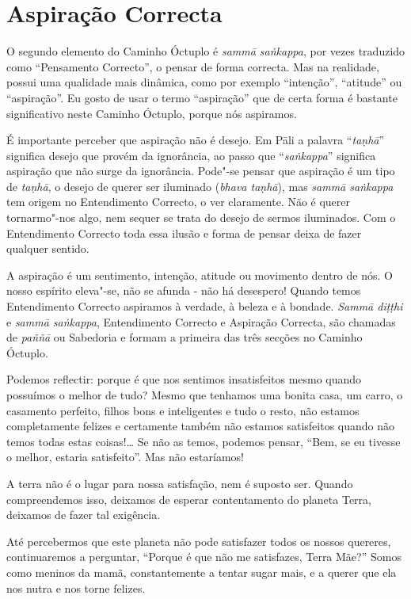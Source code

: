 \section{Aspiração Correcta}

O segundo elemento do Caminho Óctuplo é \emph{sammā saṅkappa}, por vezes traduzido como
“Pensamento Correcto”, o pensar de forma correcta. Mas na realidade, possui uma
qualidade mais dinâmica, como por exemplo “intenção”, “atitude” ou “aspiração”.
Eu gosto de usar o termo “aspiração” que de certa forma é bastante significativo
neste Caminho Óctuplo, porque nós aspiramos.

É importante perceber que aspiração não é desejo. Em Pāli a palavra
“\emph{taṇhā}” significa desejo que provém da ignorância, ao passo que
“\emph{saṅkappa}” significa aspiração que não surge da ignorância. Pode"-se
pensar que aspiração é um tipo de \emph{taṇhā}, o desejo de querer ser iluminado
(\emph{bhava taṇhā}), mas \emph{sammā saṅkappa} tem origem no Entendimento
Correcto, o ver claramente. Não é querer tornarmo"-nos algo, nem sequer se
trata do desejo de sermos iluminados. Com o Entendimento Correcto toda essa ilusão
e forma de pensar deixa de fazer qualquer sentido.

A aspiração é um sentimento, intenção, atitude ou movimento dentro de nós. O
nosso espírito eleva"-se, não se afunda - não há desespero! Quando temos
Entendimento Correcto aspiramos à verdade, à beleza e à bondade. \emph{Sammā
  diṭṭhi} e \emph{sammā saṅkappa}, Entendimento Correcto e Aspiração Correcta,
são chamadas de \emph{paññā} ou Sabedoria e formam a primeira das três secções
no Caminho Óctuplo.

\sectionBreak

Podemos reflectir: porque é que nos sentimos insatisfeitos mesmo quando
possuímos o melhor de tudo? Mesmo que tenhamos uma bonita casa, um carro, o
casamento perfeito, filhos bons e inteligentes e tudo o resto, não estamos
completamente felizes e certamente também não estamos satisfeitos quando não
temos todas estas coisas!\ldots{} Se não as temos, podemos pensar, “Bem, se eu
tivesse o melhor, estaria satisfeito”. Mas não estaríamos!

A terra não é o lugar
para nossa satisfação, nem é suposto ser. Quando compreendemos isso, deixamos de
esperar contentamento do planeta Terra, deixamos de fazer tal exigência.

Até percebermos que este planeta não pode satisfazer todos os nossos quereres,
continuaremos a perguntar, “Porque é que não me satisfazes, Terra Mãe?” Somos
como meninos da mamã, constantemente a tentar sugar mais, e a querer que ela nos
nutra e nos torne felizes.

